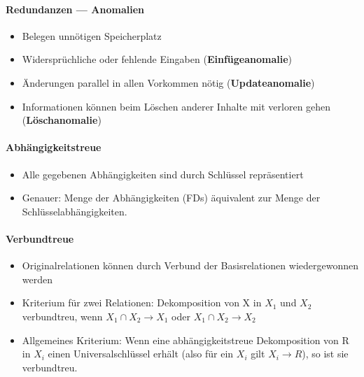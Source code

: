 \paragraph{Redundanzen --- Anomalien}
\begin{itemize}
	\item Belegen unnötigen Speicherplatz
	\item Widersprüchliche oder fehlende Eingaben (\textbf{Einfügeanomalie})
	\item Änderungen parallel in allen Vorkommen nötig (\textbf{Updateanomalie})
	\item Informationen können beim Löschen anderer Inhalte mit verloren gehen (\textbf{Löschanomalie})
\end{itemize}

\paragraph{Abhängigkeitstreue}
\begin{itemize}
	\item Alle gegebenen Abhängigkeiten sind durch Schlüssel repräsentiert
	\item Genauer: Menge der Abhängigkeiten (FDs) äquivalent zur Menge der Schlüsselabhängigkeiten.
\end{itemize}

\paragraph{Verbundtreue}
\begin{itemize}
	\item Originalrelationen können durch Verbund der Basisrelationen wiedergewonnen werden
	\item Kriterium für zwei Relationen:
	Dekomposition von X in $X_1$ und $X_2$ verbundtreu, wenn $X_1 \cap X_2 \to X_1$ oder $X_1 \cap X_2 \to X_2$
	\item Allgemeines Kriterium: 
	Wenn eine abhängigkeitstreue Dekomposition von R in $X_i$ einen Universalschlüssel erhält (also für ein $X_i$ gilt $X_i \to R$), so ist sie verbundtreu.
\end{itemize}

